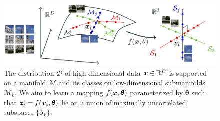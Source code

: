 \documentclass[../../book-main.tex]{subfiles}
\begin{document}
\begin{figure}
	\centering
	\includegraphics[width=0.8\linewidth]{chapters/chapter3/figs/mcr_diagram.png}
	\caption{The distribution $\mathcal D$ of high-dimensional data $\bm{x}\in \mathbb{R}^D$ is supported on  a manifold $\mathcal{M}$ and its classes on low-dimensional submanifolds $\mathcal{M}_k$. We aim to learn a mapping $f(\bm{x}, \bm  \theta)$ parameterized by $\bm \theta$ such that $\bm{z}_i = f(\bm{x}_i, \bm \theta)$ lie on a union of maximally uncorrelated subspaces $\{\mathcal{S}_k\}$.}
	\label{chap4-fig:mcr-diagram}
\end{figure}
\end{document}
